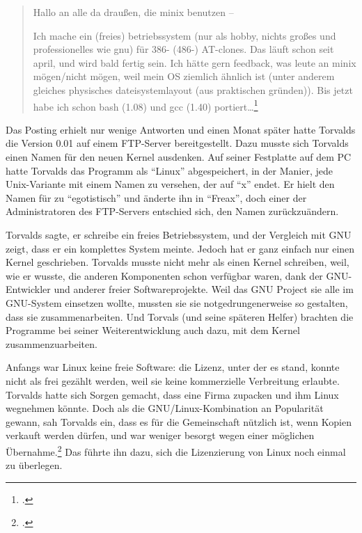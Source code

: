 \begin{quote}
Hallo an alle da draußen, die minix benutzen --

Ich mache ein (freies) betriebssystem (nur als hobby, nichts großes und professionelles wie gnu) für 386- (486-) AT-clones. Das läuft schon seit april, und wird bald fertig sein. Ich hätte gern feedback, was leute an minix mögen/nicht mögen, weil mein OS ziemlich ähnlich ist (unter anderem gleiches physisches dateisystemlayout (aus praktischen gründen)). Bis jetzt habe ich schon bash (1.08) und gcc (1.40) portiert\ldots\footcite[][S.\,85]{tojff}
\end{quote}

Das Posting erhielt nur wenige Antworten und einen Monat später hatte Torvalds die Version 0.01 auf einem FTP-Server bereitgestellt. Dazu musste sich Torvalds einen Namen für den neuen Kernel ausdenken. Auf seiner Festplatte auf dem PC hatte Torvalds das Programm als "`Linux"' abgespeichert, in der Manier, jede Unix-Variante mit einem Namen zu versehen, der auf "`x"' endet. Er hielt den Namen für zu "`egotistisch"' und änderte ihn in "`Freax"', doch einer der Administratoren des FTP-Servers entschied sich, den Namen zurückzuändern.

Torvalds sagte, er schreibe ein freies Betriebssystem, und der Vergleich mit GNU zeigt, dass er ein komplettes System meinte. Jedoch hat er ganz einfach nur einen Kernel geschrieben. Torvalds musste nicht mehr als einen Kernel schreiben, weil, wie er wusste, die anderen Komponenten schon verfügbar waren, dank der GNU-Entwickler und anderer freier Softwareprojekte. Weil das GNU Project sie alle im GNU-System einsetzen wollte, mussten sie sie notgedrungenerweise so gestalten, dass sie zusammenarbeiten. Und Torvals (und seine späteren Helfer) brachten die Programme bei seiner Weiterentwicklung auch dazu, mit dem Kernel zusammenzuarbeiten.

Anfangs war Linux keine freie Software: die Lizenz, unter der es stand, konnte nicht als frei gezählt werden, weil sie keine kommerzielle Verbreitung erlaubte. Torvalds hatte sich Sorgen gemacht, dass eine Firma zupacken und ihm Linux wegnehmen könnte. Doch als die GNU/Linux-Kombination an Popularität gewann, sah Torvalds ein, dass es für die Gemeinschaft nützlich ist, wenn Kopien verkauft werden dürfen, und war weniger besorgt wegen einer möglichen Übernahme.\footcite[][S.\,94f]{tojff} Das führte ihn dazu, sich die Lizenzierung von Linux noch einmal zu überlegen.

